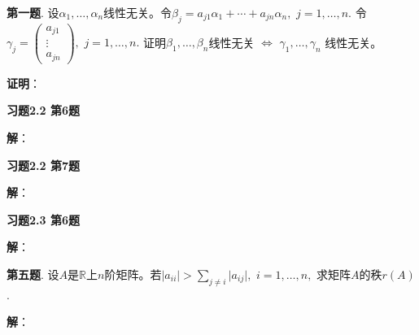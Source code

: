 
\renewcommand{\newpageorvspace}{\vspace{2em}}

\date{2022-09-23  第二次习题课}
\author{}



\maketitle


{\bf 第一题}. 设$\alpha_1, \ldots, \alpha_n$线性无关。令$\beta_j = a_{j1}\alpha_1 + \cdots + a_{jn}\alpha_n,$ $j = 1, \ldots, n.$ 令$\gamma_j = \begin{pmatrix} a_{j1} \\ \vdots \\ a_{jn} \end{pmatrix},$ $j = 1, \ldots, n.$ 证明$\beta_1, \ldots, \beta_n$线性无关 $\Longleftrightarrow$ $\gamma_1, \ldots, \gamma_n$ 线性无关。

\newpageorvspace

{\bf 证明}：

\newpageorvspace

{\bf 习题2.2 第6题} 

\newpageorvspace

{\bf 解}：

\newpageorvspace

{\bf 习题2.2 第7题} 

\newpageorvspace

{\bf 解}：

\newpageorvspace

{\bf 习题2.3 第6题} 

\newpageorvspace

{\bf 解}：

{\bf 第五题}. 设$A$是$\mathbb{R}$上$n$阶矩阵。若$\lvert a_{ii} \rvert > \sum\limits_{j\neq i} \lvert a_{ij} \rvert,$ $i = 1, \ldots, n,$ 求矩阵$A$的秩$r(A)$.

\newpageorvspace

{\bf 解}：


